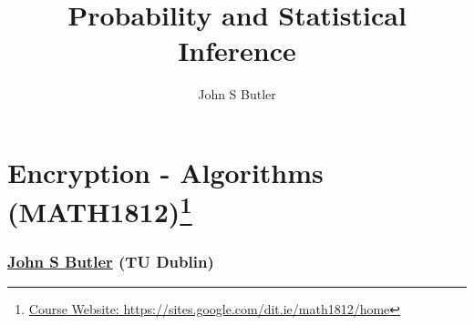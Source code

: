 \documentclass[10pt,a4paper]{article}
\title{Probability and Statistical Inference}
\author{John S Butler}
\begin{document}
\scriptsize


\section*{Encryption - Algorithms  (MATH1812)\footnote{\href{https://sites.google.com/dit.ie/math1812/home}{Course Website: https://sites.google.com/dit.ie/math1812/home}}}
\subsubsection*{\href{johnsbutler.netlify.com}{John S Butler} (TU Dublin) }
\end{document}
